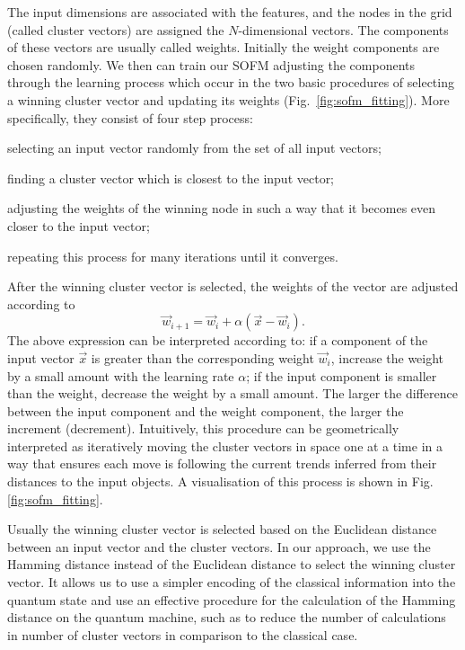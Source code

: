 \documentclass[pra,showkeys,twocolumn,showpacs]{revtex4-1}
\begin{document}
The input dimensions are associated with the features, 
and the nodes in the grid (called cluster vectors) are assigned the $N$-dimensional vectors. 
The components of these vectors are usually called weights. 
Initially the weight components are chosen randomly. 
We then can train our SOFM adjusting the components through the learning process which occur in the two basic procedures of selecting a winning cluster vector and updating its weights (Fig.~\ref{fig:sofm_fitting}). 
More specifically, they consist of four step process: \begin{enumerate*}
\item selecting an input vector randomly from the set of all input vectors; 
\item finding a cluster vector which is closest to the input vector; 
\item adjusting the weights of the winning node in such a way that it becomes even closer to the input vector; 
\item repeating this process for many iterations until it converges.
\end{enumerate*}


After the winning cluster vector is selected, the weights of the vector are adjusted according to
%
\begin{equation}
	\vec w_{i+1} =
		\vec w_i
		+ \alpha\left(\vec{x} - \vec w_i\right).
    \label{eq:learning}
\end{equation}
%
The above expression can be interpreted according to: 
if a component of the input vector $\vec{x}$ is greater than the corresponding weight $ \vec{w}_i $, 
increase the weight by a small amount with the learning rate $\alpha$; 
if the input component is smaller than the weight, decrease the weight by a small amount. 
The larger the difference between the input component and the weight component, the larger the increment (decrement). 
Intuitively, this procedure can be geometrically interpreted as iteratively moving the cluster vectors in space one at a time in a way 
that ensures each move is following the current trends inferred from their distances to the input objects. 
A visualisation of this process is shown in Fig. \ref{fig:sofm_fitting}.

Usually the winning cluster vector is selected based on the Euclidean distance between an input vector and the cluster vectors. 
In our approach, we use the Hamming distance instead of the Euclidean distance to select the winning cluster vector. 
It allows us to use a simpler encoding of the classical information into the quantum state and use an effective procedure for the calculation of the Hamming distance on the quantum machine, 
such as to reduce the number of calculations in number of cluster vectors in comparison to the classical case.
\end{document}
